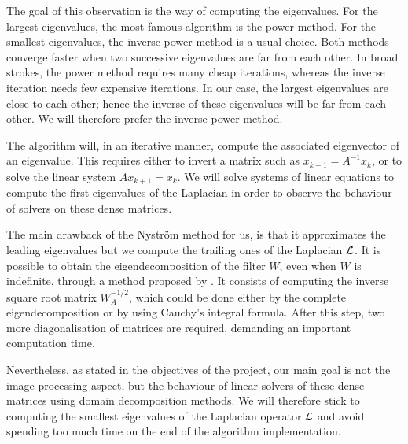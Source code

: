 The goal of this observation is the way of computing the eigenvalues.
For the largest eigenvalues, the most famous algorithm is the power method.
For the smallest eigenvalues, the inverse power method is a usual choice.
Both methods converge faster when two successive eigenvalues are far from each other.
In broad strokes, the power method requires many cheap iterations, whereas the inverse iteration needs few expensive iterations.
In our case, the largest eigenvalues are close to each other; hence the inverse of these eigenvalues will be far from each other.
We will therefore prefer the inverse power method.

The algorithm will, in an iterative manner, compute the associated eigenvector of an eigenvalue.
This requires either to invert a matrix such as \(x_{k+1} = A^{-1} x_k\), or to solve the linear system \(A x_{k+1} = x_k\).
We will solve systems of linear equations to compute the first eigenvalues of the Laplacian in order to observe the behaviour of solvers on these dense matrices.

The main drawback of the Nystr\"om method for us, is that it approximates the leading eigenvalues but we compute the trailing ones of the Laplacian \(\operatorname{\mathcal{L}}\)\ifthesis \cite{belongie_spectral_2002}\fi.
It is possible to obtain the eigendecomposition of the filter \(W\), even when \(W\) is indefinite, through a method proposed by \cite{fowlkes_spectral_2004}.
\ifthesis
 It consists of computing the inverse square root matrix \(W_A^{-1/2}\), which could be done either by the complete eigendecomposition or by using Cauchy's integral formula.
 After this step, two more diagonalisation of matrices are required, demanding an important computation time.
\fi

Nevertheless, as stated in the objectives of the project, our main goal is not the image processing aspect, but the behaviour of linear solvers of these dense matrices using domain decomposition methods.
We will therefore stick to computing the smallest eigenvalues of the Laplacian operator \(\operatorname{\mathcal{L}}\) and avoid spending too much time on the end of the algorithm implementation.
